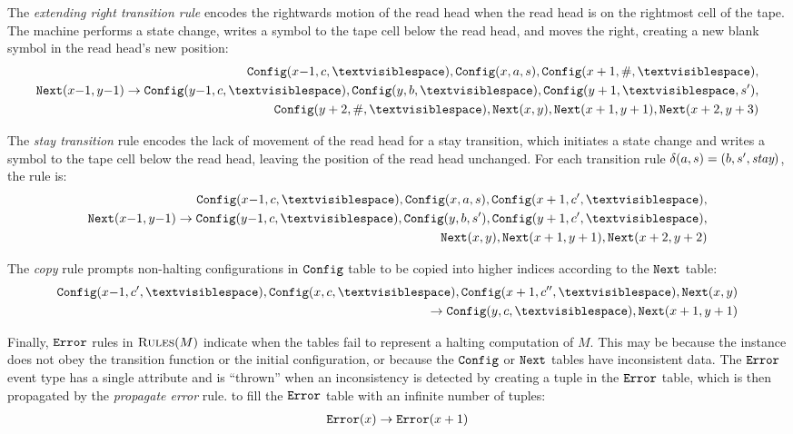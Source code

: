 The {\it extending right transition rule}
encodes the rightwards motion of the read head when the read head is on the rightmost cell of the tape. 
The machine performs a state change, writes a symbol to the tape cell below the read head, and moves the right, creating a new blank symbol in the read head's new position:
\begin{align}
    \begin{split}
\Config(x{-}1,c,\blank), \Config(x,a,s), \Config(x+1,\#,\blank),\\
\Next(x{-}1,y{-}1) \rightarrow \Config(y{-}1,c,\blank), \Config(y,b,\blank), \Config(y+1,\blank,s'),\\
\Config(y+2,\#,\blank), \Next(x,y), \Next(x+1,y+1), \Next(x+2,y+3)
    \end{split}
\end{align}

The {\it stay transition} rule
encodes the lack of movement of the read head for a stay transition,
which initiates a state change and writes a symbol to the tape cell below the read head, 
leaving the position
of the read head unchanged.
For each transition rule
$\delta(a,s)=(b,s',\mbox{\em stay})$,
the rule is:
\begin{align}
    \begin{split}
\Config(x{-}1,c,\blank), \Config(x,a,s), \Config(x+1,c',\blank),\\
\Next(x{-}1,y{-}1) \rightarrow \Config(y{-}1,c,\blank), \Config(y,b,s'), \Config(y+1,c',\blank),\\
\Next(x,y), \Next(x+1,y+1), \Next(x+2,y+2)
    \end{split}
\end{align}

The {\it copy} rule
prompts non-halting configurations in $\texttt{Config}$ table to be copied into higher indices according to the $\texttt{Next}$ table:
\begin{align}
    \begin{split}
\Config(x{-}1,c',\blank), \Config(x,c,\blank), \Config(x+1,c'',\blank), \Next(x,y)\\
\rightarrow \Config(y,c,\blank), \Next(x+1,y+1)
    \end{split}
\end{align}

Finally, $\texttt{\tt Error}$ rules in $\textsc{Rules}(M)$
indicate when the tables fail
to represent a halting computation of $M$.
This may be because the instance 
does not obey the transition function or the initial configuration,
or because the $\texttt{Config}$ or $\texttt{Next}$ tables have inconsistent data.
The $\texttt{\tt Error}$ event type has a single attribute
and is ``thrown'' when an inconsistency is detected
by creating a tuple in the $\texttt{\tt Error}$ table,
which is then propagated by the {\it propagate error} rule.
to fill the $\texttt{\tt Error}$ table with an infinite number of tuples:
\begin{align}
\texttt{\tt Error}(x) \rightarrow \texttt{\tt Error}(x+1)
\end{align}

